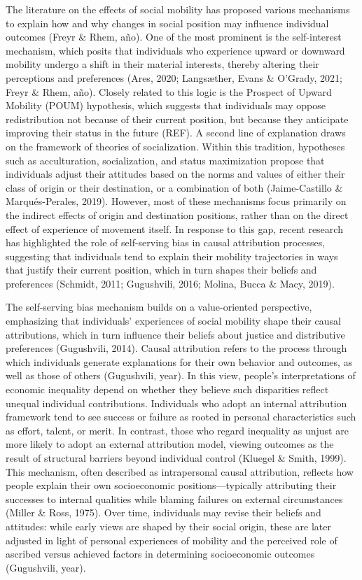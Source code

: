 \documentclass[
  12pt,
]{article}
\begin{document}
The literature on the effects of social mobility has proposed various
mechanisms to explain how and why changes in social position may
influence individual outcomes (Freyr \& Rhem, año). One of the most
prominent is the self-interest mechanism, which posits that individuals
who experience upward or downward mobility undergo a shift in their
material interests, thereby altering their perceptions and preferences
(Ares, 2020; Langsæther, Evans \& O'Grady, 2021; Freyr \& Rhem, año).
Closely related to this logic is the Prospect of Upward Mobility (POUM)
hypothesis, which suggests that individuals may oppose redistribution
not because of their current position, but because they anticipate
improving their status in the future (REF). A second line of explanation
draws on the framework of theories of socialization. Within this
tradition, hypotheses such as acculturation, socialization, and status
maximization propose that individuals adjust their attitudes based on
the norms and values of either their class of origin or their
destination, or a combination of both (Jaime-Castillo \&
Marqués-Perales, 2019). However, most of these mechanisms focus
primarily on the indirect effects of origin and destination positions,
rather than on the direct effect of experience of movement itself. In
response to this gap, recent research has highlighted the role of
self-serving bias in causal attribution processes, suggesting that
individuals tend to explain their mobility trajectories in ways that
justify their current position, which in turn shapes their beliefs and
preferences (Schmidt, 2011; Gugushvili, 2016; Molina, Bucca \& Macy,
2019).

The self-serving bias mechanism builds on a value-oriented perspective,
emphasizing that individuals' experiences of social mobility shape their
causal attributions, which in turn influence their beliefs about justice
and distributive preferences (Gugushvili, 2014). Causal attribution
refers to the process through which individuals generate explanations
for their own behavior and outcomes, as well as those of others
(Gugushvili, year). In this view, people's interpretations of economic
inequality depend on whether they believe such disparities reflect
unequal individual contributions. Individuals who adopt an internal
attribution framework tend to see success or failure as rooted in
personal characteristics such as effort, talent, or merit. In contrast,
those who regard inequality as unjust are more likely to adopt an
external attribution model, viewing outcomes as the result of structural
barriers beyond individual control (Kluegel \& Smith, 1999). This
mechanism, often described as intrapersonal causal attribution, reflects
how people explain their own socioeconomic positions---typically
attributing their successes to internal qualities while blaming failures
on external circumstances (Miller \& Ross, 1975). Over time, individuals
may revise their beliefs and attitudes: while early views are shaped by
their social origin, these are later adjusted in light of personal
experiences of mobility and the perceived role of ascribed versus
achieved factors in determining socioeconomic outcomes (Gugushvili,
year).
\end{document}
